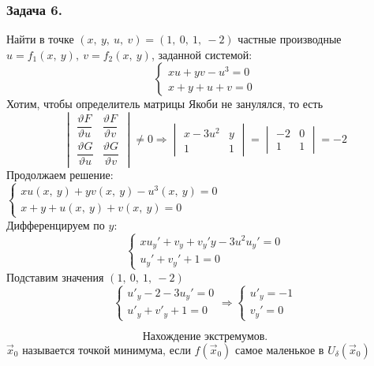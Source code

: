\documentclass[12pt, letterpaper, twoside]{article}
\begin{document}
    \subsubsection*{Задача 6.}
    Найти в точке $(x,\ y,\ u,\ v) = (1,\ 0,\ 1,\ -2)$ частные производные\\
    $u = f_1(x,\ y),\ v = f_2(x,\ y)$, заданной системой:
    \[\begin{cases}
        xu + yv - u^3 = 0\\
        x + y + u + v = 0
    \end{cases}\]
    Хотим, чтобы определитель матрицы Якоби не занулялся, то есть
    \[\begin{vmatrix}
        \dfrac{\vartheta F}{\vartheta u} & \dfrac{\vartheta F}{\vartheta v}\\
        \dfrac{\vartheta G}{\vartheta u} & \dfrac{\vartheta G}{\vartheta v}
    \end{vmatrix} \neq 0\Rightarrow \begin{vmatrix}
        x - 3u^2 & y\\
        1 & 1
    \end{vmatrix} = \begin{vmatrix}
        -2 & 0\\
        1 & 1
    \end{vmatrix} = -2\]
    Продолжаем решение:\\
    $\begin{cases}
        xu(x,\ y) + yv(x,\ y) - u^3(x,\ y) = 0\\
        x + y + u(x,\ y) + v (x,\ y) = 0
    \end{cases}$\\
    Дифференцируем по $y$:
    \[\begin{cases}
        xu_y' + v_y + v_y' y - 3u^2u_y' = 0\\
        u_y' + v_y' + 1 = 0
    \end{cases}\]
    Подставим значения $(1,\ 0,\ 1,\ -2)$
    \[\begin{cases}
        u'_y - 2 - 3u_y' = 0\\
        u'_y + v'_y + 1 = 0
    \end{cases}\Rightarrow \begin{cases}
        u'_y = -1\\
        v_y' = 0
    \end{cases}\]
    
\[\text{Нахождение экстремумов.}\]
    $\vec{x}_0$ называется точкой минимума, если $f(\vec{x}_0)$ самое маленькое в $U_{\delta}(\vec{x}_0)$
\end{document}
